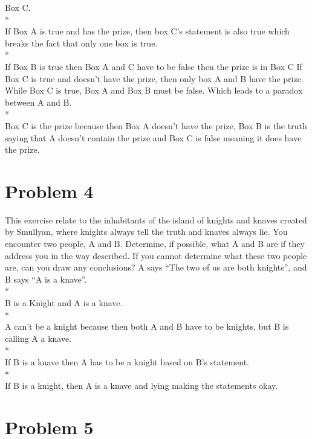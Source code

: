 \documentclass[11pt]{article}
\begin{document}
	Box C.\\*\\
	 If Box A is true and has the prize, then box C's statement is also true which breaks the fact that only one box is true.\\*\\
	 If Box B is true then Box A and C have to be false then the prize is in Box C
	 If Box C is true and doesn't have the prize, then only box A and B have the prize. While Box C is true, Box A and Box B must be false. Which leads to a paradox between A and B.\\*\\
	  Box C is the prize because then Box A doesn't have the prize, Box B is the truth saying that A doesn't contain the prize and Box C is false meaning it does have the prize.
	

			
	
	\section*{Problem 4} 
	
This exercise relate to the inhabitants of the island of knights and knaves created by
Smullyan, where knights always tell the truth and knaves always lie. You encounter two
people, A and B. Determine, if possible, what A and B are if they address you in the way
described. If you cannot determine what these two people are, can you draw any
conclusions?
A says “The two of us are both knights”, and B says “A is a knave”.
\\*\\
B is a Knight and A is a knave. \\*\\
A can't be a knight because then both A and B have to be  knights, but B is calling A a knave. \\*\\
If B is a knave then A has to be a knight based on B's statement.\\*\\
If B is a knight, then A is a knave and lying making the statements okay.

\newpage
	\section*{Problem 5} 
\end{document}
